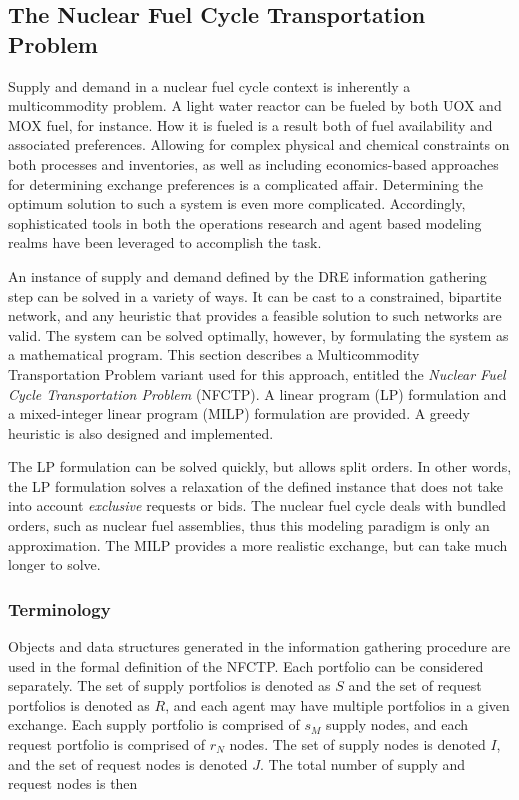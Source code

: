 \subsection{The Nuclear Fuel Cycle Transportation Problem}\label{abm:dre:fctp}

Supply and demand in a nuclear fuel cycle context is inherently a multicommodity
problem. A light water reactor can be fueled by both UOX and MOX fuel, for
instance. How it is fueled is a result both of fuel availability and associated
preferences. Allowing for complex physical and chemical constraints on both
processes and inventories, as well as including economics-based approaches for
determining exchange preferences is a complicated affair. Determining the
optimum solution to such a system is even more complicated. Accordingly,
sophisticated tools in both the operations research and agent based modeling
realms have been leveraged to accomplish the task.

An instance of supply and demand defined by the DRE information gathering step
can be solved in a variety of ways. It can be cast to a constrained, bipartite
network, and any heuristic that provides a feasible solution to such networks
are valid. The system can be solved optimally, however, by formulating the
system as a mathematical program. This section describes a Multicommodity
Transportation Problem variant used for this approach, entitled the
\textit{Nuclear Fuel Cycle Transportation Problem} (NFCTP). A linear program
(LP) formulation and a mixed-integer linear program (MILP) formulation are
provided. A greedy heuristic is also designed and implemented.

The LP formulation can be solved quickly, but allows split orders. In other
words, the LP formulation solves a relaxation of the defined instance that does
not take into account \textit{exclusive} requests or bids. The nuclear fuel
cycle deals with bundled orders, such as nuclear fuel assemblies, thus this
modeling paradigm is only an approximation. The MILP provides a more realistic
exchange, but can take much longer to solve. 

\subsubsection{Terminology}

Objects and data structures generated in the information gathering procedure are
used in the formal definition of the NFCTP. Each portfolio can be considered
separately. The set of supply portfolios is denoted as $S$ and the set of
request portfolios is denoted as $R$, and each agent may have multiple
portfolios in a given exchange. Each supply portfolio is comprised of $s_M$
supply nodes, and each request portfolio is comprised of $r_N$ nodes. The set of
supply nodes is denoted $I$, and the set of request nodes is denoted $J$. The
total number of supply and request nodes is then

